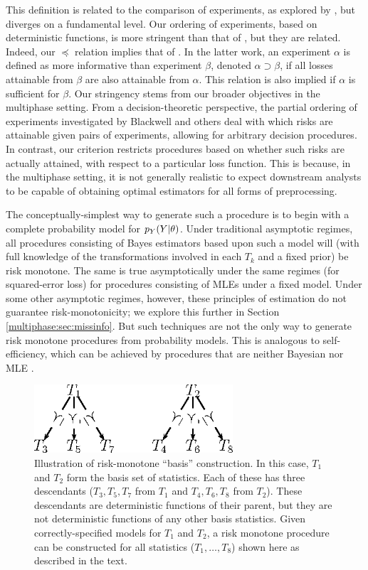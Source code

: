 This definition is related to the comparison of experiments, as explored by \citet{Blackwell51,Blackwell53}, but diverges on a fundamental level.
Our ordering of experiments, based on deterministic functions, is more stringent than that of \cite{Blackwell53}, but they are related.
Indeed, our $\preceq$ relation implies that of \citet{Blackwell53}.
In the latter work, an experiment $\alpha$ is defined as more informative than experiment $\beta$, denoted $\alpha \supset \beta$, if all losses attainable from $\beta$ are also attainable from $\alpha$.
This relation is also implied if $\alpha$ is sufficient for $\beta$.
Our stringency stems from our broader objectives in the multiphase setting.
From a decision-theoretic perspective, the partial ordering of experiments investigated by Blackwell and others deal with which risks are attainable given pairs of experiments, allowing for arbitrary decision procedures.
In contrast, our criterion restricts procedures based on whether such risks are actually attained, with respect to a particular loss function.
This is because, in the multiphase setting, it is not generally realistic to expect downstream analysts to be capable of obtaining optimal estimators for all forms of preprocessing.

The conceptually-simplest way to generate such a procedure is to begin with a complete probability model for $p_Y(Y | \theta)$.
Under traditional asymptotic regimes, all procedures consisting of Bayes estimators based upon such a model will (with full knowledge of the transformations involved in each $T_k$ and a fixed prior) be risk monotone.
The same is true asymptotically under the same regimes (for squared-error loss) for procedures consisting of MLEs under a fixed model.
Under some other asymptotic regimes, however, these principles of estimation do not guarantee risk-monotonicity; we explore this further in Section \ref{multiphase:sec:missinfo}.
But such techniques are not the only way to generate risk monotone procedures from probability models.
This is analogous to self-efficiency, which can be achieved by procedures that are neither Bayesian nor MLE \citep{Meng1994,Xie2012}.

\begin{figure}
\centering
\includegraphics[height=1in]{figures/multiphase/diagram_risk-monotone.eps}
\caption{Illustration of risk-monotone ``basis'' construction. In this case, $T_1$ and $T_2$ form the basis set of statistics. Each of these has three descendants ($T_3, T_5, T_7$ from $T_1$ and $T_4, T_6, T_8$ from $T_2$). These descendants are deterministic functions of their parent, but they are not deterministic functions of any other basis statistics. Given correctly-specified models for $T_1$ and $T_2$, a risk monotone procedure can be constructed for all statistics ($T_1, \ldots, T_8$) shown here as described in the text.
\label{multiphase:fig:risk-monotone}}
\end{figure}

